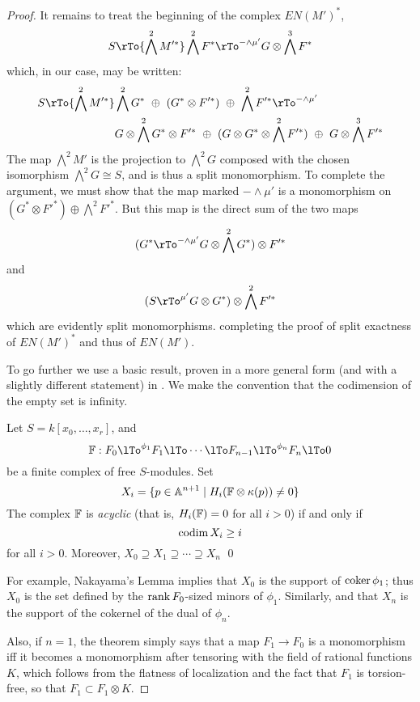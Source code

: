 \begin{proof}
It remains to treat the beginning of the complex $EN(M')^*$,
$$
S \rTo{\bigwedge^2 M'^*} 
 \bigwedge^2 F^*
 \rTo^{-\wedge \mu'}
G\otimes \bigwedge^3 F^*
$$
which, in our case, may be written:
\begin{align*}
S \rTo{\bigwedge^2 M'^*} 
 &\bigwedge^2 G^* \ \oplus\ (G^*\otimes F'^*)\ \oplus\ \bigwedge^2 F'^*
 \rTo^{-\wedge \mu'} \\
 &G\otimes \bigwedge^2 G^*\otimes F'^*\ \oplus\ (G\otimes G^*\otimes \bigwedge^2 F'^*)\ \oplus\ G\otimes \bigwedge^3 F'^*
\end{align*}
The map $\bigwedge^2 M'$ is the projection to $\bigwedge^2 G$ composed with the chosen isomorphism
$\bigwedge^2 G \cong S$, and is thus a split monomorphism. To complete the argument, we must show that
 the map marked $-\wedge \mu'$ is a monomorphism on $(G^*\otimes F'^*) \oplus \bigwedge^2 F'^*$.
 But this map is the direct sum of the two maps
  $$
 (G^* \rTo^{-\wedge \mu'} G\otimes \bigwedge^2 G^*)  \otimes F'^*
 $$
 and
 $$
(S  \rTo^{\mu'} G\otimes G^*) \otimes \bigwedge^2 F'^*
 $$
 which are evidently split monomorphisms. 
completing the proof of split exactness of $EN(M')^*$ and thus of $EN(M')$.


To go further we use a basic result, proven in a more general form (and with a slightly different statement) in \cite[Theorem ***]{E}. We make the convention
that the codimension of the empty set is infinity.

\begin{theorem}\label{WMACE}
 Let $S = k[x_0,\dots, x_r]$, and
 $$ 
\FF:  F_0\lTo^{\phi_1}F_1 \lTo \cdots \lTo F_{n-1}\lTo^{\phi_n} F_n\lTo 0
 $$
be a finite complex of free $S$-modules. Set
$$
X_i = \{p\in \mathbb A^{n+1} \mid  H_i({\mathbb F} \otimes \kappa(p)) \neq 0\}
$$
The complex ${\mathbb F}$ is \emph{acyclic} (that is, $H_i({\mathbb F}) = 0$ for all $i>0$) if and only if
$$
\operatorname{codim} X_i \geq i
$$
for all $i>0$. Moreover, $X_{0}\supseteq X_{1}\supseteq \cdots \supseteq X_{n}$
\qed
\end{theorem}

For example, Nakayama's Lemma implies that $X_{0}$ is the support of ${\rm{coker}\,} \phi_{1}$; thus $X_{0}$ is the set defined by the $\operatorname{rank} F_{0}$-sized minors of $\phi_{1}$. Similarly, 
and that $X_{n}$ is the support of the cokernel of the dual of $\phi_{n}$. 

Also, if $n=1$, the theorem simply says that a map $F_1\to F_0$ is a monomorphism iff it becomes a monomorphism after tensoring with the field of rational functions $K$, which follows from the flatness of
localization and the fact that $F_1$ is torsion-free, so that
$F_1 \subset F_1 \otimes K$. 


\end{proof}
